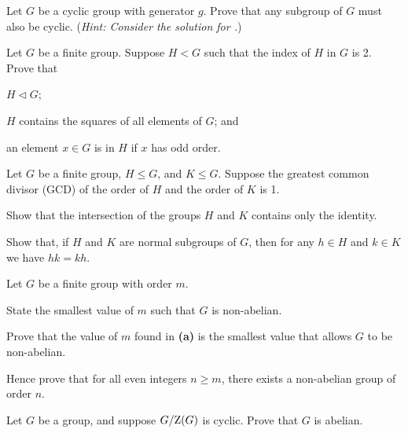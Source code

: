 \begin{problem}\label{problem-subgroup-of-cyclic-group-is-cyclic}
    Let $G$ be a cyclic group with generator $g$. Prove that any subgroup of $G$ must also be cyclic.\newline
    (\textit{Hint: Consider the solution for .})
\end{problem}

\newpage

\begin{problem}\label{problem-subgroup-of-index-2}
    Let $G$ be a finite group. Suppose $H < G$ such that the index of $H$ in $G$ is 2. Prove that
    \begin{partquestions}{\roman*}
        \item $H \lhd G$;
        \item $H$ contains the squares of all elements of $G$; and
        \item an element $x \in G$ is in $H$ if $x$ has odd order.
    \end{partquestions}
\end{problem}

\begin{problem}\label{problem-intersection-of-coprime-subgroups}
    Let $G$ be a finite group, $H \leq G$, and $K \leq G$. Suppose the greatest common divisor (GCD) of the order of $H$ and the order of $K$ is 1.
    \begin{partquestions}{\alph*}
        \item Show that the intersection of the groups $H$ and $K$ contains only the identity.
        \item Show that, if $H$ and $K$ are normal subgroups of $G$, then for any $h \in H$ and $k \in K$ we have $hk = kh$.
    \end{partquestions}
\end{problem}

\begin{problem}\label{problem-smallest-nonabelian-group}
    Let $G$ be a finite group with order $m$.
    \begin{partquestions}{\alph*}
        \item State the smallest value of $m$ such that $G$ is non-abelian.
        \item Prove that the value of $m$ found in \textbf{(a)} is the smallest value that allows $G$ to be non-abelian.
        \item Hence prove that for all even integers $n \geq m$, there exists a non-abelian group of order $n$.
    \end{partquestions}
\end{problem}

\begin{problem}\label{problem-quotient-of-group-mod-center-is-cyclic-implies-abelian}
    Let $G$ be a group, and suppose $G / \mathrm{Z}(G)$ is cyclic. Prove that $G$ is abelian.
\end{problem}
